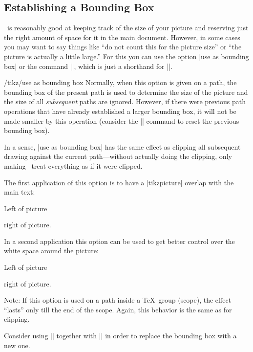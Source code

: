 \subsection{Establishing a Bounding Box}

\pgfname\ is reasonably good at keeping track of the size of your picture
and reserving just the right amount of space for it in the main
document. However, in some cases you may want to say things like
``do not count this for the picture size'' or ``the picture is
actually a little large.'' For this you can use the option
|use as bounding box| or the command |\useasboundingbox|, which is just
a shorthand for ||.

\begin{key}{/tikz/use as bounding box}
  Normally, when this option is given on a path, the bounding box of
  the present path is used to determine the size of the picture and
  the size of all \emph{subsequent} paths are
  ignored. However, if there were previous path operations that have
  already established a larger bounding box, it will not be made
  smaller by this operation (consider the |\pgfresetboundingbox| command
  to reset the previous bounding box).

  In a sense, |use as bounding box| has the same effect as clipping
  all subsequent drawing against the current path---without actually
  doing the clipping, only making \pgfname\ treat everything as if it
  were clipped.

  The first application of this option is to have a |{tikzpicture}|
  overlap with the main text:

\begin{codeexample}[]
Left of pictureright of picture.
\end{codeexample}

  In a second application this option can be used to get better
  control over the white space around the picture:
  
\begin{codeexample}[]
Left of picture
right of picture.
\end{codeexample}

  Note: If this option is used on a path inside a \TeX\ group (scope),
  the effect ``lasts'' only till the end of the scope. Again, this
  behavior is the same as for clipping.


  Consider using |\useasboundingbox| together with |\pgfresetboundingbox| in order to replace the bounding box with a new one.
\end{key}

